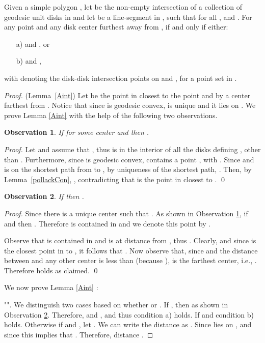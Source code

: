 \documentclass{llncs}
\newtheorem{obs}{Observation}
\begin{document}
\begin{lemma}
Given a  simple polygon , let  be the non-empty intersection of a collection of geodesic unit disks in  and let   be a line-segment in , such that for all ,  and .   For any point  and any disk center  furthest away from ,  if and only if either:
\begin{enumerate}
\item[a)]  and , or
\item[b)]  and , 
\end{enumerate}
\label{Aint}
with  denoting the disk-disk intersection points on  and , for a point set  in . 
\end{lemma}

\begin{proof}(Lemma~\ref{Aint})
Let  be the point in  closest to the point  and by  a center farthest from . Notice that since  is geodesic convex,  is unique {and it lies on }.  We prove Lemma \ref{Aint} with the help of the following two observations.

\begin{obs}
If  for some center  and  then .
\label{PinI}
\end{obs}
\begin{proof}
Let  and assume that , thus  is in the interior of all the disks defining , other than . Furthermore,  since  is geodesic convex,  contains a point , with .  Since  and  is on the shortest path from  to , by uniqueness of the shortest path, .  Then, by Lemma~\ref{pollackCon}, , contradicting  that  is the point in  closest to .  \qed
\end{proof}

\begin{obs}
If  then . 
\label{PinA}
\end{obs}
\begin{proof}
Since  there is a unique center  such that .    As shown in Observation \ref{PinI}, if  and  then . Therefore  is contained in  and we denote this point by .

Observe that  is contained in  and is at distance  from , thus .  Clearly,   and since  is the closest point in  to , it follows that .  Now observe that, since  and the distance between  and any other center is less than  (because ),  is the farthest center, i.e., .  Therefore   holds as claimed.  \qed
\end{proof}

We now prove Lemma \ref{Aint} :

"".  We distinguish two cases based on whether  or  .  If , then  as shown in Observation \ref{PinA}. Therefore,  and , and thus condition a) holds.  If  and  condition b) holds.  Otherwise if  and   , let . We can write the distance  as . Since  lies on ,  and since  this implies that . Therefore, distance . 


\end{proof}
\end{document}
